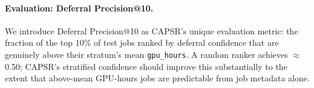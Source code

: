 \paragraph{Evaluation: Deferral Precision@10.}
We introduce Deferral Precision@10 as CAPSR's unique evaluation metric: the
fraction of the top 10\% of test jobs ranked by deferral confidence that are
genuinely above their stratum's mean \texttt{gpu\_hours}.  A random ranker
achieves $\approx$0.50; CAPSR's stratified confidence should improve this
substantially to the extent that above-mean GPU-hours jobs are predictable
from job metadata alone.

